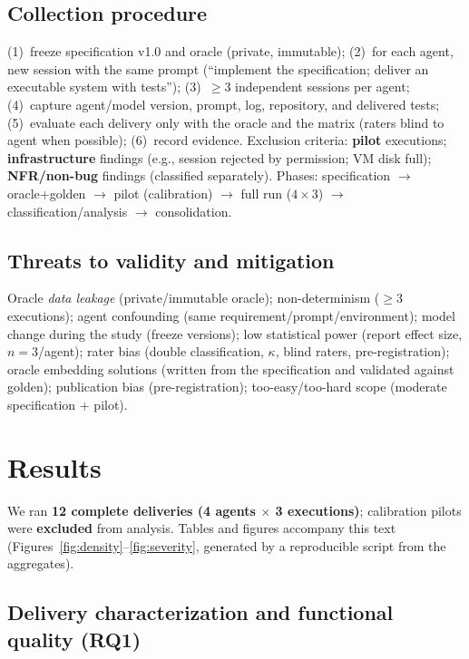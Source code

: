 \documentclass[11pt]{article}
\begin{document}
\subsection{Collection procedure}

(1)~freeze specification v1.0 and oracle (private, immutable); (2)~for each agent, new session with the same prompt (``implement the specification; deliver an executable system with tests''); (3)~$\geq$3 independent sessions per agent; (4)~capture agent/model version, prompt, log, repository, and delivered tests; (5)~evaluate each delivery only with the oracle and the matrix (raters blind to agent when possible); (6)~record evidence. Exclusion criteria: \textbf{pilot} executions; \textbf{infrastructure} findings (e.g., session rejected by permission; VM disk full); \textbf{NFR/non-bug} findings (classified separately). Phases: specification $\rightarrow$ oracle+golden $\rightarrow$ pilot (calibration) $\rightarrow$ full run ($4\times3$) $\rightarrow$ classification/analysis $\rightarrow$ consolidation.

\subsection{Threats to validity and mitigation}\label{sec:threats}

Oracle \emph{data leakage} (private/immutable oracle); non-determinism ($\geq$3 executions); agent confounding (same requirement/prompt/environment); model change during the study (freeze versions); low statistical power (report effect size, $n=3$/agent); rater bias (double classification, $\kappa$, blind raters, pre-registration); oracle embedding solutions (written from the specification and validated against golden); publication bias (pre-registration); too-easy/too-hard scope (moderate specification + pilot).

\section{Results}\label{sec:results}

We ran \textbf{12 complete deliveries (4 agents $\times$ 3 executions)}; calibration pilots were \textbf{excluded} from analysis. Tables and figures accompany this text (Figures~\ref{fig:density}--\ref{fig:severity}, generated by a reproducible script from the aggregates).

\subsection{Delivery characterization and functional quality (RQ1)}
\end{document}
